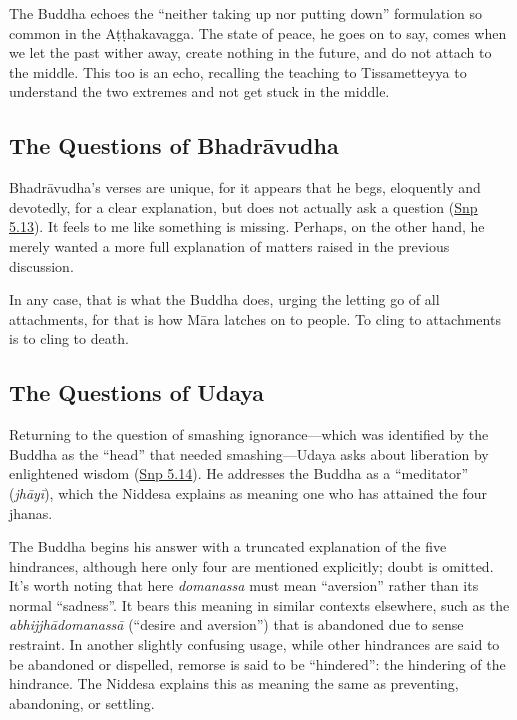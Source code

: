 \documentclass[12pt,openany]{book}%
\begin{document}
The Buddha echoes the “neither taking up nor putting down” formulation so common in the \textsanskrit{Aṭṭhakavagga}. The state of peace, he goes on to say, comes when we let the past wither away, create nothing in the future, and do not attach to the middle. This too is an echo, recalling the teaching to Tissametteyya to understand the two extremes and not get stuck in the middle.

\subsection*{The Questions of \textsanskrit{Bhadrāvudha}}

\textsanskrit{Bhadrāvudha}’s verses are unique, for it appears that he begs, eloquently and devotedly, for a clear explanation, but does not actually ask a question (\href{https://suttacentral.net/snp5.13/en/sujato}{Snp 5.13}). It feels to me like something is missing. Perhaps, on the other hand, he merely wanted a more full explanation of matters raised in the previous discussion.

In any case, that is what the Buddha does, urging the letting go of all attachments, for that is how \textsanskrit{Māra} latches on to people. To cling to attachments is to cling to death.

\subsection*{The Questions of Udaya}

Returning to the question of smashing ignorance—which was identified by the Buddha as the “head” that needed smashing—Udaya asks about liberation by enlightened wisdom (\href{https://suttacentral.net/snp5.14/en/sujato}{Snp 5.14}). He addresses the Buddha as a “meditator” (\textit{\textsanskrit{jhāyī}}), which the Niddesa explains as meaning one who has attained the four jhanas.

The Buddha begins his answer with a truncated explanation of the five hindrances, although here only four are mentioned explicitly; doubt is omitted. It’s worth noting that here \textit{domanassa} must mean “aversion” rather than its normal “sadness”. It bears this meaning in similar contexts elsewhere, such as the \textit{\textsanskrit{abhijjhādomanassā}} (“desire and aversion”) that is abandoned due to sense restraint. In another slightly confusing usage, while other hindrances are said to be abandoned or dispelled, remorse is said to be “hindered”: the hindering of the hindrance. The Niddesa explains this as meaning the same as preventing, abandoning, or settling.
\end{document}
